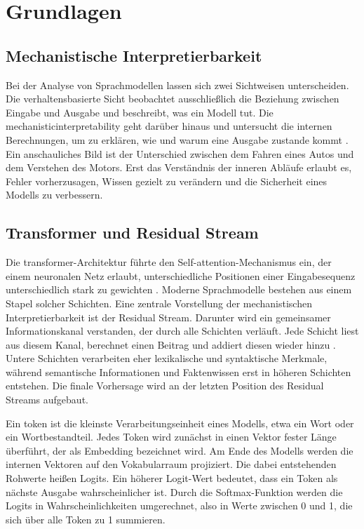 \section{Grundlagen}

\subsection{Mechanistische Interpretierbarkeit}

Bei der Analyse von Sprachmodellen lassen sich zwei Sichtweisen unterscheiden. Die verhaltensbasierte Sicht beobachtet ausschließlich die Beziehung zwischen Eingabe und Ausgabe und beschreibt, was ein Modell tut. Die \gls{mechanisticinterpretability} geht darüber hinaus und untersucht die internen Berechnungen, um zu erklären, wie und warum eine Ausgabe zustande kommt \cite{nanda2023comprehensive}. Ein anschauliches Bild ist der Unterschied zwischen dem Fahren eines Autos und dem Verstehen des Motors. Erst das Verständnis der inneren Abläufe erlaubt es, Fehler vorherzusagen, Wissen gezielt zu verändern und die Sicherheit eines Modells zu verbessern.

\subsection{Transformer und Residual Stream}

Die \gls{transformer}-Architektur führte den Self-\gls{attention}-Mechanismus ein, der einem neuronalen Netz erlaubt, unterschiedliche Positionen einer Eingabesequenz unterschiedlich stark zu gewichten \cite{vaswani2017attention}. Moderne Sprachmodelle bestehen aus einem Stapel solcher Schichten. Eine zentrale Vorstellung der mechanistischen Interpretierbarkeit ist der Residual Stream. Darunter wird ein gemeinsamer Informationskanal verstanden, der durch alle Schichten verläuft. Jede Schicht liest aus diesem Kanal, berechnet einen Beitrag und addiert diesen wieder hinzu \cite{elhage2021mathematical}. Untere Schichten verarbeiten eher lexikalische und syntaktische Merkmale, während semantische Informationen und Faktenwissen erst in höheren Schichten entstehen. Die finale Vorhersage wird an der letzten Position des Residual Streams aufgebaut.

Ein \gls{token} ist die kleinste Verarbeitungseinheit eines Modells, etwa ein Wort oder ein Wortbestandteil. Jedes Token wird zunächst in einen Vektor fester Länge überführt, der als Embedding bezeichnet wird. Am Ende des Modells werden die internen Vektoren auf den Vokabularraum projiziert. Die dabei entstehenden Rohwerte heißen Logits. Ein höherer Logit-Wert bedeutet, dass ein Token als nächste Ausgabe wahrscheinlicher ist. Durch die Softmax-Funktion werden die Logits in Wahrscheinlichkeiten umgerechnet, also in Werte zwischen 0 und 1, die sich über alle Token zu 1 summieren.

